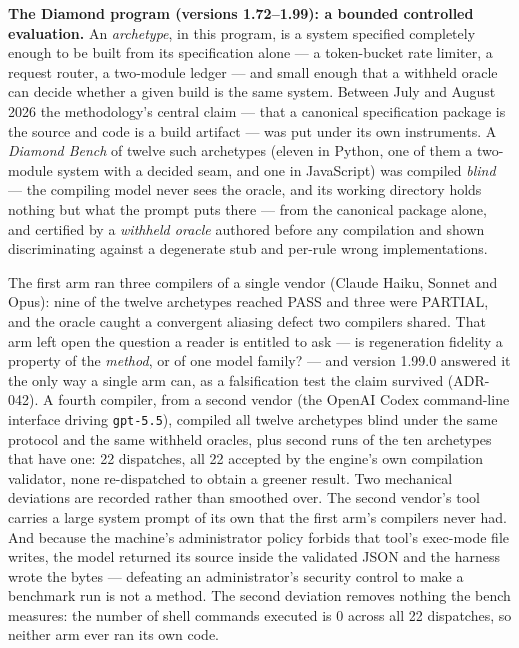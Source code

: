 \documentclass[11pt]{article}
\begin{document}
\textbf{The Diamond program (versions 1.72--1.99): a bounded controlled evaluation.}
An \emph{archetype}, in this program, is a system specified completely enough to be
built from its specification alone --- a token-bucket rate limiter, a request router,
a two-module ledger --- and small enough that a withheld oracle can decide whether a
given build is the same system. Between July and August 2026 the methodology's central
claim --- that a canonical specification package is the source and code is a build
artifact --- was put under its own instruments. A \emph{Diamond Bench} of twelve such
archetypes (eleven in Python, one of them a two-module system with a decided seam, and
one in JavaScript) was compiled \emph{blind} --- the compiling model never sees the
oracle, and its working directory holds nothing but what the prompt puts there ---
from the canonical package alone, and certified by a \emph{withheld oracle} authored
before any compilation and shown discriminating against a degenerate stub and per-rule
wrong implementations.

The first arm ran three compilers of a single vendor (Claude Haiku, Sonnet and Opus):
nine of the twelve archetypes reached PASS and three were PARTIAL, and the oracle
caught a convergent aliasing defect two compilers shared. That arm left open the
question a reader is entitled to ask --- is regeneration fidelity a property of the
\emph{method}, or of one model family? --- and version 1.99.0 answered it the only way
a single arm can, as a falsification test the claim survived (ADR-042). A fourth
compiler, from a second vendor (the OpenAI Codex command-line interface driving
\texttt{gpt-5.5}), compiled all twelve archetypes blind under the same protocol and
the same withheld oracles, plus second runs of the ten archetypes that have one: 22
dispatches, all 22 accepted by the engine's own compilation validator, none
re-dispatched to obtain a greener result. Two mechanical deviations are recorded
rather than smoothed over. The second vendor's tool carries a large system prompt of
its own that the first arm's compilers never had. And because the machine's
administrator policy forbids that tool's exec-mode file writes, the model returned its
source inside the validated JSON and the harness wrote the bytes --- defeating an
administrator's security control to make a benchmark run is not a method. The second
deviation removes nothing the bench measures: the number of shell commands executed is
0 across all 22 dispatches, so neither arm ever ran its own code.
\end{document}
